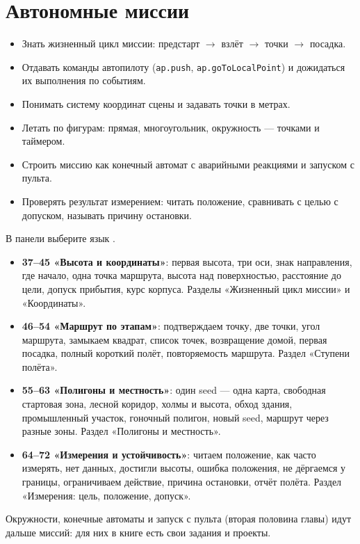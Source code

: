 \section{Автономные миссии}
\label{sec:missions}

\begin{infobox}
\begin{itemize}
    \item Знать жизненный цикл миссии: предстарт $\to$ взлёт $\to$ точки $\to$ посадка.
    \item Отдавать команды автопилоту (\texttt{ap.push}, \texttt{ap.goToLocalPoint}) и дожидаться их выполнения по событиям.
    \item Понимать систему координат сцены и задавать точки в метрах.
    \item Летать по фигурам: прямая, многоугольник, окружность --- точками и таймером.
    \item Строить миссию как конечный автомат с аварийными реакциями и запуском с пульта.
    \item Проверять результат измерением: читать положение, сравнивать с целью с допуском, называть причину остановки.
\end{itemize}
\end{infobox}

\begin{missionbox}
В панели  выберите язык .
\begin{itemize}
    \item \textbf{37--45 «Высота и координаты»}: первая высота, три оси, знак направления, где начало, одна точка маршрута, высота над поверхностью, расстояние до цели, допуск прибытия, курс корпуса. Разделы «Жизненный цикл миссии» и «Координаты».
    \item \textbf{46--54 «Маршрут по этапам»}: подтверждаем точку, две точки, угол маршрута, замыкаем квадрат, список точек, возвращение домой, первая посадка, полный короткий полёт, повторяемость маршрута. Раздел «Ступени полёта».
    \item \textbf{55--63 «Полигоны и местность»}: один seed --- одна карта, свободная стартовая зона, лесной коридор, холмы и высота, обход здания, промышленный участок, гоночный полигон, новый seed, маршрут через разные зоны. Раздел «Полигоны и местность».
    \item \textbf{64--72 «Измерения и устойчивость»}: читаем положение, как часто измерять, нет данных, достигли высоты, ошибка положения, не дёргаемся у границы, ограничиваем действие, причина остановки, отчёт полёта. Раздел «Измерения: цель, положение, допуск».
\end{itemize}
Окружности, конечные автоматы и запуск с пульта (вторая половина главы) идут дальше миссий: для них в книге есть свои задания и проекты.
\end{missionbox}

